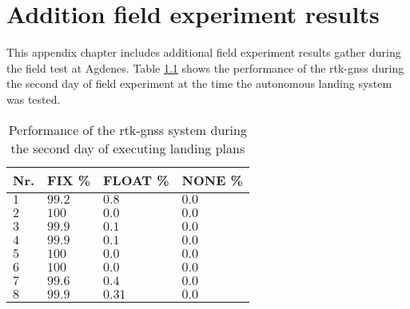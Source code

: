 \chapter{Addition field experiment results}\label{AP:ADDResults}
This appendix chapter includes additional field experiment results gather during the field test at Agdenes. Table \ref{TB:RTKSecondDayLanding} shows the performance of the \gls{rtk-gnss} during the second day of field experiment at the time the autonomous landing system was tested.
\begin{table}[H]
\centering
\begin{tabular}{| l | l | l | l |}
\hline
\textbf{Nr.}	& \textbf{FIX \%}	& \textbf{FLOAT \%}	& \textbf{NONE \%}	\\ \hline
$1$				& $99.2 $	& $0.8$	& $0.0$									\\ \hline
$2$				& $100 $	& $0.0$	& $0.0$									\\ \hline
$3$				& $99.9 $	& $0.1$	& $0.0$									\\ \hline
$4$				& $99.9$		& $0.1$	& $0.0$									\\ \hline
$5$				& $100$		& $0.0$	& $0.0$									\\ \hline
$6$				& $100$		& $0.0$	& $0.0$									\\ \hline
$7$				& $99.6$	& $0.4$	& $0.0$									\\ \hline
$8$				& $99.9 $ 	& $0.31$	& $0.0$									\\ \hline
\end{tabular}
\caption{Performance of the \gls{rtk-gnss} system during the second day of executing landing plans}
\label{TB:RTKSecondDayLanding}
\end{table}
